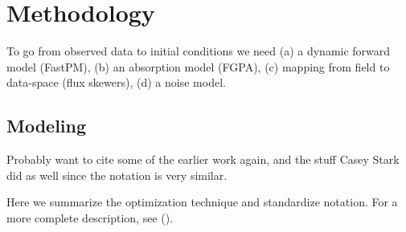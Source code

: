 \documentclass[times]{aastex62}
\newcommand{\mpc}{\ensuremath{\, h^{-1}\,\mathrm{Mpc} }}
\newcommand{\lya}{Ly$\alpha$}
\begin{document}




\section{Methodology}
\label{sec:method}

To go from observed data to initial conditions we need (a) a dynamic forward model (FastPM), (b) an absorption model (FGPA), (c) mapping from field to data-space (flux skewers), (d) a noise model.

\subsection{Modeling}

{\color{red}Probably want to cite some of the earlier work again, and the stuff Casey Stark did as well since the notation is very similar.}

Here we summarize the optimization technique and standardize notation. For a more complete description, see (\cite{seljak1998cosmography,2009simon,seljak2017towards,2018Horowitz}).
\end{document}
